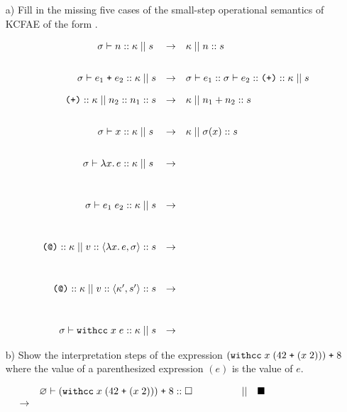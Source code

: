\begin{enumerate}
\begin{itemize}
  \item[a)] Fill in the missing five cases of the small-step operational semantics of KCFAE
of the form .

{
\[
\begin{array}{rcl}
\sigma \vdash n :: \kappa \; || \; s \; &\rightarrow& \kappa \; || \; n :: s\\[2em]
\sigma \vdash e_1 \; \mbox{\texttt{+}}\; e_2 :: \kappa \; || \; s &\rightarrow& \sigma \vdash e_1 :: \sigma \vdash e_2 :: \mbox{\texttt{(+)}} :: \kappa \; || \; s\\[1em]
\mbox{\texttt{(+)}} :: \kappa \; || \; n_2 :: n_1 :: s &\rightarrow& \kappa \; || \; n_1 + n_2 :: s\\[2em]
\sigma \vdash x :: \kappa \; || \; s \; &\rightarrow& \kappa \; || \; \sigma(x) :: s\\[2em]
\sigma \vdash \lambda x.\, e :: \kappa \; || \; s \; 
&\rightarrow& \\[3em]
\sigma \vdash e_1 \; e_2 :: \kappa \; || \; s &\rightarrow&\\[3em]
\mbox{\texttt{(@)}} :: \kappa \; || \; v :: \langle \lambda x.\,e, \sigma \rangle :: s &\rightarrow&\\[3em]
\mbox{\texttt{(@)}} :: \kappa \; || \; v :: \langle \kappa', s'\rangle :: s
& \rightarrow & \\[3em]
\sigma \vdash \mbox{\texttt{withcc}} \; x \; e :: \kappa \; || \; s
& \rightarrow & 
\end{array}
\]
}

  \item[b)] Show the interpretation steps of the expression
\( (\mbox{\texttt{withcc}} \; x \; (42 \; \mbox{\texttt{+}} \; (x \; 2))) \; \mbox{\texttt{+}} \; 8 \)
where the value of a parenthesized expression $(e)$ is the value of $e$.
\end{itemize}

{
\[
\hspace*{-5em}
\begin{array}{rlcl}
  & \varnothing \vdash (\mbox{\texttt{withcc}} \; x \; (42 \; \mtt{+} \; (x \; 2))) \; \mtt{+} \; 8 :: \square
\qquad\qquad
 & || & \blacksquare\\
  \rightarrow
  & \\
\end{array}
\]
}


\end{enumerate}
